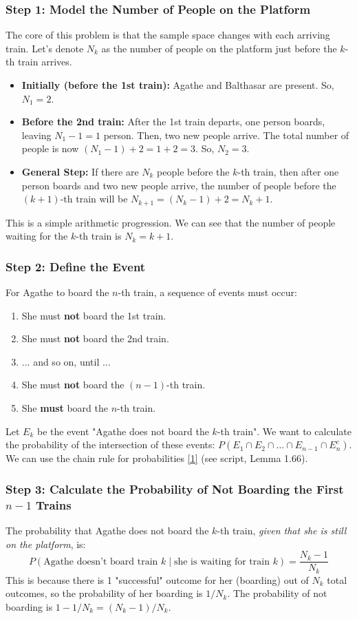 \documentclass[11pt,a4paper]{article}
\begin{document}
\subsubsection*{Step 1: Model the Number of People on the Platform}
The core of this problem is that the sample space changes with each arriving train. Let's denote $N_k$ as the number of people on the platform just before the $k$-th train arrives.

\begin{itemize}
    \item \textbf{Initially (before the 1st train):} Agathe and Balthasar are present. So, $N_1 = 2$.
    \item \textbf{Before the 2nd train:} After the 1st train departs, one person boards, leaving $N_1 - 1 = 1$ person. Then, two new people arrive. The total number of people is now $(N_1 - 1) + 2 = 1 + 2 = 3$. So, $N_2 = 3$.
    \item \textbf{General Step:} If there are $N_k$ people before the $k$-th train, then after one person boards and two new people arrive, the number of people before the $(k+1)$-th train will be $N_{k+1} = (N_k - 1) + 2 = N_k + 1$.
\end{itemize}
This is a simple arithmetic progression. We can see that the number of people waiting for the $k$-th train is $N_k = k + 1$.

\subsubsection*{Step 2: Define the Event}
For Agathe to board the $n$-th train, a sequence of events must occur:
\begin{enumerate}
    \item She must \textbf{not} board the 1st train.
    \item She must \textbf{not} board the 2nd train.
    \item ... and so on, until ...
    \item She must \textbf{not} board the $(n-1)$-th train.
    \item She \textbf{must} board the $n$-th train.
\end{enumerate}
Let $E_k$ be the event "Agathe does not board the $k$-th train". We want to calculate the probability of the intersection of these events: $P(E_1 \cap E_2 \cap \dots \cap E_{n-1} \cap E_n^c)$. We can use the chain rule for probabilities \hyperlink{note1}{[1]} (see script, Lemma 1.66).

\subsubsection*{Step 3: Calculate the Probability of Not Boarding the First $n-1$ Trains}
The probability that Agathe does not board the $k$-th train, \textit{given that she is still on the platform}, is:
$$ P(\text{Agathe doesn't board train } k \mid \text{she is waiting for train } k) = \frac{N_k - 1}{N_k} $$
This is because there is 1 "successful" outcome for her (boarding) out of $N_k$ total outcomes, so the probability of her boarding is $1/N_k$. The probability of not boarding is $1 - 1/N_k = (N_k - 1)/N_k$.
\end{document}
